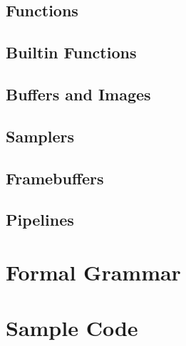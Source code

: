 \documentclass[11pt]{article}
\begin{document}
\subsection{Functions}

\subsection{Builtin Functions} \label{builtins}

\subsection{Buffers and Images}

\subsection{Samplers}

\subsection{Framebuffers}

\subsection{Pipelines}

\section{Formal Grammar}

\section{Sample Code}
\end{document}
